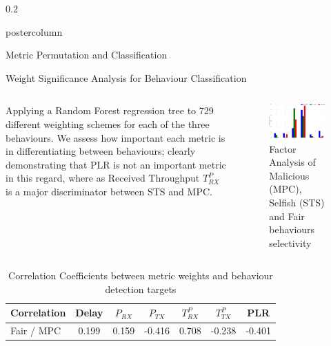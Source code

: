 \documentclass[final,hyperref={pdfpagelabels=false}]{beamer}
\def\colwidth{0.2\linewidth}
\begin{document}
\begin{frame}[fragile]
\begin{columns}[T]
\begin{column}{\colwidth}
\begin{beamercolorbox}[center,wd=\textwidth]{postercolumn}
\begin{minipage}[T]{.98\textwidth}
{\begin{block}{Metric Permutation and Classification}
						\end{block}						
						\begin{block}{Weight Significance Analysis for Behaviour Classification}
							\begin{columns}[T]
								\begin{column}{0.416\textwidth}
								Applying a Random Forest regression tree to 729 different weighting schemes for each of the three behaviours. We assess how important each metric is in differentiating between behaviours; clearly demonstrating that PLR is not an important metric in this regard, where as Received Throughput $T_{RX}^P$ is a major discriminator between STS and MPC.
								\end{column}
								\begin{column}{0.416\textwidth}
								\begin{figure}
									\centering
									\includegraphics[width=\linewidth]{MaliciousSelfishMetricFactors}
									\caption{Factor Analysis of Malicious (MPC), Selfish (STS) and Fair behaviours selectivity}
									\label{fig:malselfactors}
								\end{figure}
							\end{column}
							\end{columns}
							\begin{table}[h]
								\caption{Correlation Coefficients between metric weights and behaviour detection targets} \label{tab:correlations}
								\begin{center}
									\begin{tabular}{lcccccc}
										\toprule
										Correlation      & Delay & $P_{RX}$ & $P_{TX}$ & $T^P_{RX}$ & $T^P_{TX}$ & PLR \\
										\midrule
										Fair / MPC       & 0.199 &  0.159   & -0.416  &  0.708   & -0.238   & -0.401\\

\end{tabular}
\end{center}
\end{table}
\end{block}}
\end{minipage}
\end{beamercolorbox}
\end{column}
\end{columns}
\end{frame}
\end{document}
